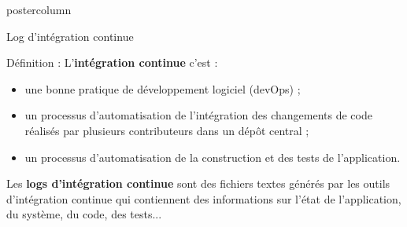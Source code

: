 \newif\ifinria
\def\ptitle{Comparaison de métriques de similarité pour la détection de différences dans les logs d'intégration continue} %
\def\pauthor{Yamine Belkhedra} %
\def\padvisors{Nicolas Hubner} %
\def\pteam{Bordeaux INP} %
\def\pinstitute{Enseirb-Matmeca, LaBRI} %
\def\pdate{Jeudi 25 Avril 2024} %
\inriafalse %



\graphicspath{{./fig/}} %
\setlength{\columnheight}{588ex} %
\newcommand{\pname}{\textsc{Priva-Stream}\xspace} %


\begin{frame}
  \begin{columns}
    \begin{column}{.49\textwidth}
      \begin{beamercolorbox}[center,wd=\textwidth]{postercolumn}
        \begin{minipage}[T]{.95\textwidth}
          \parbox[t][\columnheight]{\textwidth}{
            
            \begin{block}{Log d'intégration continue}
            
            Définition : L'\textbf{intégration continue} c'est :

            \begin{itemize}
              \item une bonne pratique de développement logiciel (devOps) ;
              \item un processus d'automatisation de l'intégration des changements de code réalisés par plusieurs contributeurs dans un dépôt central ;
              \item un processus d'automatisation de la construction et des tests de l'application.
            \end{itemize}

            Les \textbf{logs d'intégration continue} sont des fichiers textes générés par les outils d'intégration continue qui contiennent des informations sur l'état de l'application, du système, du code, des tests...



\end{block}}
\end{minipage}
\end{beamercolorbox}
\end{column}
\end{columns}
\end{frame}
